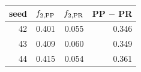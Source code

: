 \begin{tabular}{rrrr}\toprule
seed & $f_{2,\rm PP}$ & $f_{2,\rm PR}$ & PP $-$ PR \\
\midrule
42 & 0.401 & 0.055 & 0.346 \\
43 & 0.409 & 0.060 & 0.349 \\
44 & 0.415 & 0.054 & 0.361 \\
\bottomrule\end{tabular}
